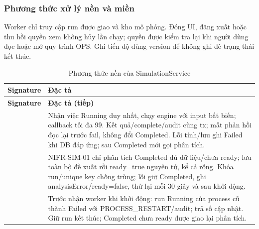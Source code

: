 \subsubsection{Phương thức xử lý nền và miền}
Worker chỉ truy cập run được giao và kho mô phỏng. Đóng UI, đăng xuất hoặc thu hồi quyền xem không hủy lần chạy; quyền được kiểm tra lại khi người dùng đọc hoặc mở quy trình OPS. Ghi tiến độ dùng version để không ghi đè trạng thái kết thúc.

\begin{longtable}{|L{58mm}|L{81mm}|}
\caption{Phương thức nền của SimulationService}\\\hline
\textbf{Signature} & \textbf{Đặc tả}\\\hline
\endfirsthead
\hline\textbf{Signature} & \textbf{Đặc tả (tiếp)}\\\hline\endhead
{} &
Nhận việc Running duy nhất, chạy engine với input bất biến; callback tối đa 99. Kết quả/complete/audit cùng tx; mất phản hồi đọc lại trước fail, không đổi Completed. Lỗi tính/lưu ghi Failed khi DB đáp ứng; sau Completed mới gọi phân tích.\\\hline
{} &
NIFR-SIM-01 chỉ phân tích Completed đủ dữ liệu/chưa ready; lưu toàn bộ đề xuất rồi ready=true nguyên tử, kể cả rỗng. Khóa run/unique key chống trùng; lỗi giữ Completed, ghi analysisError/ready=false, thử lại mỗi 30 giây và sau khởi động.\\\hline
{} &
Trước nhận worker khi khởi động: run Running của process cũ thành Failed với PROCESS\_RESTART/audit; trả số cập nhật. Giữ run kết thúc; Completed chưa ready được giao lại phân tích.\\\hline
\end{longtable}


